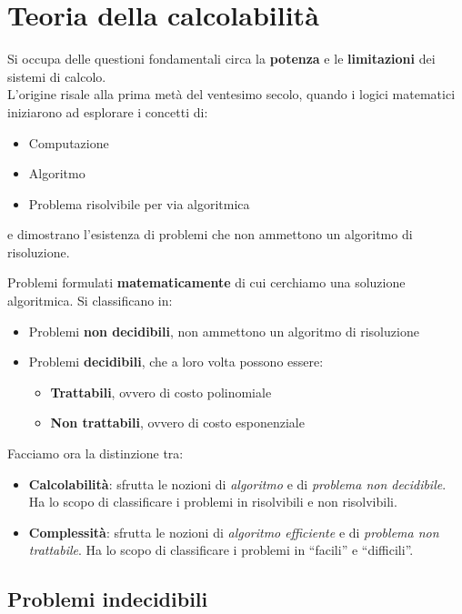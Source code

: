 \newpage
\section{Teoria della calcolabilità}
Si occupa delle questioni fondamentali circa la \textbf{potenza} e le \textbf{limitazioni} dei sistemi di calcolo. \\
L'origine risale alla prima metà del ventesimo secolo, quando i logici matematici iniziarono ad esplorare i concetti di:
\begin{itemize}
	\item Computazione
	\item Algoritmo
	\item Problema risolvibile per via algoritmica
\end{itemize}
e dimostrano l'esistenza di problemi che non ammettono un algoritmo di risoluzione.\\
\begin{definition}
	Problemi formulati \textbf{matematicamente} di cui cerchiamo una soluzione algoritmica. Si classificano in:
	\begin{itemize}
		\item Problemi \textbf{non decidibili}, non ammettono un algoritmo di risoluzione
		\item Problemi \textbf{decidibili}, che a loro volta possono essere:
		\begin{itemize}
			\item \textbf{Trattabili}, ovvero di costo polinomiale
			\item \textbf{Non trattabili}, ovvero di costo esponenziale
		\end{itemize}
	\end{itemize}
\end{definition}

\noindent Facciamo ora la distinzione tra:
\begin{itemize}
	\item \textbf{Calcolabilità}: sfrutta le nozioni di \emph{algoritmo} e di \emph{problema non decidibile}. Ha lo scopo di classificare i problemi in risolvibili e non risolvibili.
	\item  \textbf{Complessità}: sfrutta le nozioni di \emph{algoritmo efficiente} e di \emph{problema non trattabile}. Ha lo scopo di classificare i problemi in “facili” e “difficili”.
\end{itemize}

\subsection{Problemi indecidibili}
